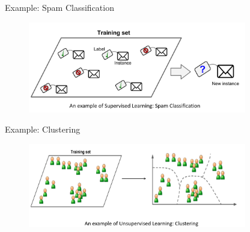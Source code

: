 \begin{frame}{Example: Spam Classification}
    \begin{figure}
        \centering
        \includegraphics[width=0.85\textwidth]{images/linear-regression/linear-regression-3.png}
    \end{figure}
\end{frame}


\begin{frame}{Example: Clustering}
    \begin{figure}
        \centering
        \includegraphics[width=0.85\textwidth]{images/linear-regression/linear-regression-4.png}
    \end{figure}
\end{frame}
